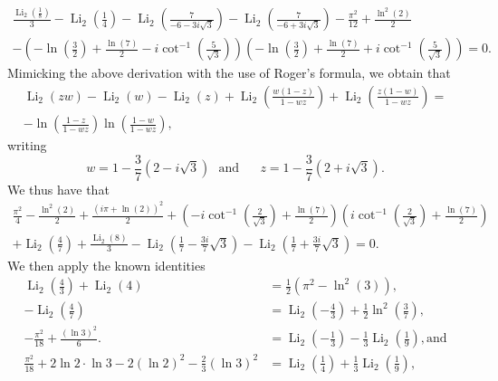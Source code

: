 \documentclass[12pt]{article}
\begin{document}
\begin{multline*}
 \frac{\operatorname{Li}_2\left(\frac{1}{8}\right)}{3} - \operatorname{Li}_2\left(\frac{1}{4}\right) - \operatorname{Li}_2\left(\frac{7}{-6 - 3i\sqrt{3}}\right) 
 - \operatorname{Li}_2\left(\frac{7}{-6 + 3i\sqrt{3}}\right) - \frac{\pi^2}{12} + \frac{\ln^2(2)}{2}\\ 
 - \left( -\ln\left(\frac{3}{2}\right) + \frac{\ln(7)}{2} - i \cot^{-1}\left(\frac{5}{\sqrt{3}}\right) \right) \left( -\ln\left(\frac{3}{2}\right) + 
 \frac{\ln(7)}{2} + i \cot^{-1}\left(\frac{5}{\sqrt{3}}\right) \right)=0. 
\end{multline*}
 Mimicking the above derivation with the use of Roger's formula, 
 we obtain that 
\begin{multline*}
 \operatorname{Li}_2(z w) - \operatorname{Li}_2(w) - \operatorname{Li}_2(z) + \operatorname{Li}_2\left(\frac{w(1 - z)}{1 - w z}\right) + \operatorname{Li}_2\left(\frac{z(1 - 
 w)}{1 - w z}\right) = \\ 
 -\ln\left(\frac{1 - z}{1 - w z}\right) \ln\left(\frac{1 - w}{1 - w z}\right), 
\end{multline*}
 writing 
\begin{equation*}
 w = 1 - \frac{3}{7}(2 - i\sqrt{3}) \ \ \ \text{and} \ \ \ \quad z = 1 - \frac{3}{7}(2 + i\sqrt{3}). 
\end{equation*}
 We thus have that 
\begin{equation*}
\begin{aligned}
\frac{\pi^2}{4} - \frac{\ln^2(2)}{2} + \frac{(i \pi + \ln(2))^2}{2} 
+ \left( -i \cot^{-1}\left(\frac{2}{\sqrt{3}}\right) + \frac{\ln(7)}{2} \right)\left( i \cot^{-1}\left(\frac{2}{\sqrt{3}}\right) + \frac{\ln(7)}{2} \right)\\
+ \operatorname{Li}_2\left(\frac{4}{7}\right) + \frac{\operatorname{Li}_2(8)}{3} - \operatorname{Li}_2\left(\frac{1}{7} - \frac{3i}{7}\sqrt{3}\right) - \operatorname{Li}_2\left(\frac{1}{7} + \frac{3i}{7}\sqrt{3}\right)=0. 
\end{aligned}
\end{equation*}
 We then apply the known identities 
\begin{align}
 \operatorname{Li}_2\left(\frac{4}{3}\right) + \operatorname{Li}_2(4) & = \frac{1}{2}\left( \pi^2 
 - \ln^2(3) \right), \nonumber \\ 
 -\operatorname{Li}_2\left(\frac{4}{7}\right) & = \operatorname{Li}_2\left(-\frac{4}{3}\right) + 
 \frac{1}{2} \ln^2\left(\frac{3}{7}\right), \nonumber \\ 
 -\frac{{\pi}^2}{18}+\frac{(\ln 3)^2}{6}. & = \operatorname{Li}_2\left(-\frac{1}{3}\right) - 
 \frac{1}{3}\operatorname{Li}_2\left(\frac{1}{9}\right), \text{and} \nonumber \\ 
 \frac{{\pi}^2}{18}+2\ln2\cdot\ln3-2(\ln 2)^2-\frac{2}{3}(\ln 3)^2 
 & = \operatorname{Li}_2\left(\frac{1}{4}\right) + 
 \frac{1}{3}\operatorname{Li}_2\left(\frac{1}{9}\right), \label{previously4p28}
\end{align}
\end{document}
